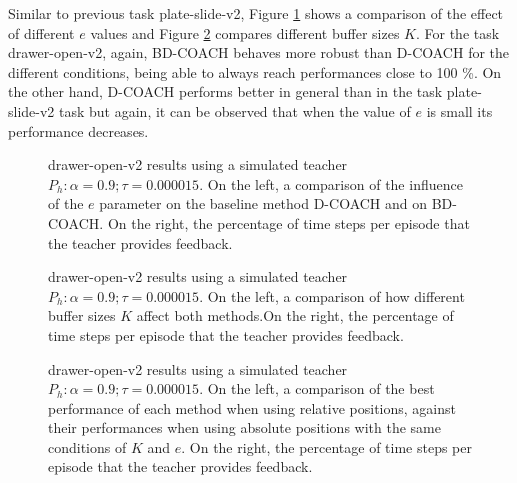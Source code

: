Similar to previous task plate-slide-v2, Figure \ref{fig:results_drawer-open-same-buffer} shows a comparison of the effect of different $e$ values and Figure \ref{fig:results_drawer-open-same-e} compares different buffer sizes $K$. For the task drawer-open-v2, again, BD-COACH behaves more robust than D-COACH for the different conditions, being able to always reach performances close to 100 \%. On the other hand, D-COACH performs better in general than in the task plate-slide-v2 task but again, it can be observed that when the value of $e$ is small its performance decreases.



 \begin{figure}[H]
  \centering
   \hfill
  \caption{drawer-open-v2 results using a simulated teacher $P_h: \alpha = 0.9; \tau =  0.000015$. On the left, a comparison of the influence of the $e$ parameter on the baseline method D-COACH and on BD-COACH. On the right, the percentage of time steps per episode that the teacher  provides feedback.}
  \label{fig:results_drawer-open-same-buffer}
\end{figure}




 \begin{figure}[H]
  \centering
   \hfill
  \caption{drawer-open-v2 results using a simulated teacher $P_h: \alpha = 0.9; \tau =  0.000015$. On the left, a comparison of how different buffer sizes $K$ affect both methods.On the right, the percentage of time steps per episode that the teacher  provides feedback.}
  \label{fig:results_drawer-open-same-e}
\end{figure}

 \begin{figure}[H]
  \centering
   \hfill
  \caption{drawer-open-v2 results using a simulated teacher $P_h: \alpha = 0.9; \tau =  0.000015$. On the left, a comparison of the best performance of each method when using relative positions, against their performances when using absolute positions with the same conditions of $K$ and $e$. On the right, the percentage of time steps per episode that the teacher  provides feedback.}
  \label{fig:results_drawer-open-best}
\end{figure}





